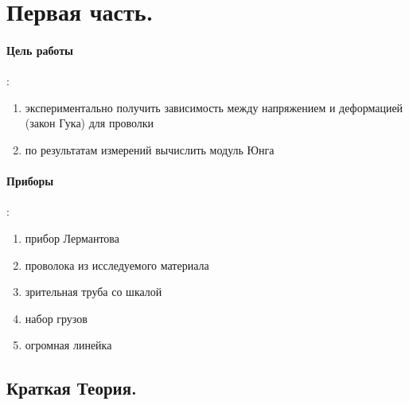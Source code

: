 \documentclass[a4paper,12pt]{article}
\begin{document}

\tableofcontents

\section{Первая часть.}

\paragraph{Цель работы}:
\begin{enumerate}
  \item экспериментально получить зависимость между напряжением и деформацией (закон Гука) для проволки
  \item по результатам измерений вычислить модуль Юнга
\end{enumerate}

\paragraph{Приборы}:
\begin{enumerate}
  \item прибор Лермантова
  \item проволока из исследуемого материала
  \item зрительная труба со шкалой
  \item набор грузов
  \item огромная линейка
\end{enumerate}

\subsection{Краткая Теория.}
\end{document}
